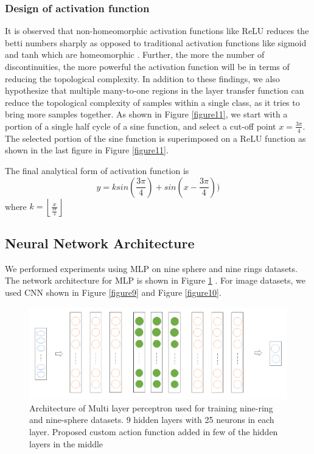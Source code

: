 \documentclass{bmvc2k}
\begin{document}
\subsubsection{Design of activation function}\label{design_of_activation_function}
It is observed that non-homeomorphic activation functions like ReLU reduces the betti numbers sharply as opposed to traditional  activation functions like sigmoid and tanh which are  homeomorphic \cite{naitzat2020topology}.
Further, the more the number of discontinuities, the more powerful the activation function will be in terms of reducing the topological complexity.
In addition to these findings, we also hypothesize that multiple many-to-one regions in the layer transfer function can reduce the topological complexity  of samples within a single class, as it tries to bring more samples together.
As shown in Figure \ref{figure11}, we start with  a portion of a single half cycle of a sine function, and select a cut-off point $x=\frac{3\pi}{4}$.
The selected portion of the sine function is superimposed on a ReLU function as shown in the last figure in Figure \ref{figure11}.

The final analytical form of activation function is
\begin{equation}
y = ksin(\frac{3\pi}{4})   + sin(x - \frac{3\pi}{4}))
\end{equation}
\vspace{-0.2in}
 where $k=\left \lfloor{\frac{x}{\frac{3\pi}{4}}}\right \rfloor$
\subsection{Neural Network Architecture}
We performed experiments using MLP  on nine sphere and nine rings datasets.
The network architecture for MLP is shown in Figure \ref{figure8} . For image datasets, we used CNN shown in Figure \ref{figure9} and Figure \ref{figure10}.

\begin{figure}
    \centering
    \includegraphics[width=.6\linewidth]{images/mlp_arch.png}
    \vspace{.1in}
    \caption{Architecture of Multi layer perceptron used for training nine-ring and nine-sphere datasets. 9 hidden layers with 25 neurons in each layer. Proposed custom action function added in few of the hidden layers in the middle }
    \label{figure8}
    \end{figure}
\end{document}
